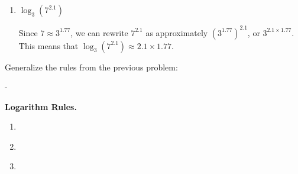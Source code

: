 \documentclass{article}
\makeatletter
\newlength{\tipmargin}
\renewenvironment{framed}{
  \setlength{\tipmargin}{\textwidth-\linewidth}
  \advance\@totalleftmargin-\tipmargin
  \def\FrameCommand{\hspace{\tipmargin}\fbox}%
  \advance\linewidth\tipmargin
  \MakeFramed {\advance\hsize-\width \FrameRestore}%
}
{\endMakeFramed}
\makeatother
\begin{document}
\begin{enumerate}
\begin{enumerate}
\begin{enumerate}
    \begin{solution}
      Using the same idea as before,
      we can rewrite $28=4\times 7$ as approximately
      $3^{1.26} \times 3^{1.77}$, 
      which is $3^{1.26+1.77}$, so $\log_3(28) \approx 1.26 + 1.77$.
    \end{solution}

  \item
    \begin{problem}[\vfill]
      $\log_3 \left( 7^{2.1} \right)$
    \end{problem}

    \begin{solution}
      Since $7 \approx 3^{1.77}$, we can rewrite $7^{2.1}$ as approximately
      $(3^{1.77})^{2.1}$, or $3^{2.1\times1.77}$. This means that
      $\log_3\left(7^{2.1}\right) \approx 2.1 \times 1.77$.
    \end{solution}
\end{enumerate}
  \end{enumerate}

\end{enumerate}
Generalize the rules from the previous problem:

\begin{framed}
  \textbf{Logarithm Rules.}  
  \begin{enumerate}[topsep=0pt]
  \item {} \

    \bigskip

  \item {}\

    \bigskip

  \item {}\

    \bigskip

  \end{enumerate}  
\end{framed}
\end{document}
